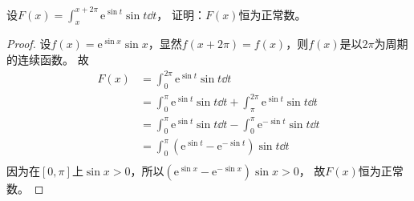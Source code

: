 \begin{example}
    设$\displaystyle F(x) = \int_x^{x+2\pi} \mathrm{e}^{\sin t}\sin t\dd{t}$，
    证明：$F(x)$恒为正常数。
\end{example}

\begin{proof}
    设$f(x)= \mathrm{e}^{\sin x}\sin x$，显然$f(x+2\pi) = f(x)$，则$f(x)$是以$2\pi$为周期的连续函数。
    故
    \begin{align*}
        F(x) & = \int_0^{2\pi} \mathrm{e}^{\sin t}\sin t\dd{t}                                                  \\
             & = \int_0^{\pi}\mathrm{e}^{\sin t}\sin t\dd{t} + \int_{\pi}^{2\pi}\mathrm{e}^{\sin t}\sin t\dd{t} \\
             & = \int_0^{\pi}\mathrm{e}^{\sin t}\sin t\dd{t} - \int_0^{\pi}\mathrm{e}^{-\sin t}\sin t\dd{t}     \\
             & = \int_0^{\pi}\left(\mathrm{e}^{\sin t} - \mathrm{e}^{-\sin t}\right)\sin t\dd{t}                \\
    \end{align*}
    因为在$[0,\pi]$上$\sin x > 0$，所以$\left(\mathrm{e}^{\sin x} - \mathrm{e}^{-\sin x}\right)\sin x >0$，
    故$F(x)$恒为正常数。
\end{proof}

